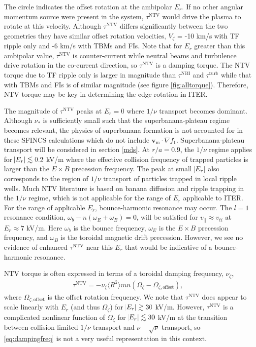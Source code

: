 \documentclass[aip, pop, preprint]{revtex4-1}
\numberwithin{figure}{section}
\numberwithin{equation}{section}
\begin{document}
The circle indicates the offset rotation at the ambipolar $E_r$. If no other angular momentum source were present in the system, $\tau^{\mathrm{NTV}}$ would drive the plasma to rotate at this velocity. Although $\tau^{\mathrm{NTV}}$ differs significantly between the two geometries they have similar offset rotation velocities, $V_{\zeta}$ = -10 km/s with TF ripple only and -6 km/s with TBMs and FIs. Note that for $E_r$ greater than this ambipolar value, $\tau^{\mathrm{NTV}}$ is counter-current while neutral beams and turbulence drive rotation in the co-current direction, so $\tau^{\mathrm{NTV}}$ is a damping torque. The NTV torque due to TF ripple only is larger in magnitude than $\tau^{\mathrm{NBI}}$ and $\tau^{\mathrm{turb}}$ while that with TBMs and FIs is of similar magnitude (see figure \ref{fig:alltorque}). Therefore, NTV torque may be key in determining the edge rotation in ITER. 

The magnitude of $\tau^{\mathrm{NTV}}$ peaks at $E_r = 0$ where $1/\nu$ transport becomes dominant. Although $\nu_*$ is sufficiently small such that the superbanana-plateau regime becomes relevant, the physics of superbanana formation is not accounted for in these SFINCS calculations which do not include $\bm{v}_{\mathrm{m}} \cdot \nabla f_1$. Superbanana-plateau transport will be considered in section \ref{mds}. At $r/a = 0.9$, the $1/\nu$ regime applies for $\abs{E_r} \lesssim 0.2$ kV/m where the effective collision frequency of trapped particles is larger than the $E \times B$ precession frequency. The peak at small $\abs{E_r}$ also corresponds to the region of $1/\nu$ transport of particles trapped in local ripple wells. Much NTV literature is based on banana diffusion and ripple trapping in the $1/\nu$ regime,\cite{Stringer1972, Connor1974} which is not applicable for the range of $E_r$ applicable to ITER. For the range of applicable $E_r$, bounce-harmonic resonance may occur. The $l =1$ resonance condition, $\omega_b - n(\omega_E + \omega_B) = 0$, will be satisfied for $v_{||} \approx v_{ti}$ at $E_r \approx 7$ kV/m. Here $\omega_b$ is the bounce frequency, $\omega_E$ is the $E \times B$ precession frequency, and $\omega_B$ is the toroidal magnetic drift precession.\cite{Park2009} However, we see no evidence of enhanced $\tau^{\mathrm{NTV}}$ near this $E_r$ that would be indicative of a bounce-harmonic resonance.

NTV torque is often expressed in terms of a toroidal damping frequency, $\nu_{\zeta}$,
\begin{gather}
\tau^{\mathrm{NTV}} = - \nu_{\zeta} \langle R^2 \rangle m n ( \Omega_{\zeta} - \Omega_{\zeta, \mathrm{offset}}),
\label{eq:dampingfreq}
\end{gather}
where $\Omega_{\zeta, \mathrm{offset}}$ is the offset rotation frequency. We note that $\tau^{\mathrm{NTV}}$ does appear to scale linearly with $E_r$ (and thus $\Omega_{\zeta}$) for $\abs{E_r} \gtrsim 30$ kV/m. However, $\tau^{\mathrm{NTV}}$ is a complicated nonlinear function of $\Omega_{\zeta}$ for $\abs{E_r} \lesssim 30$ kV/m at the transition between collision-limited $1/\nu$ transport and $\nu-\sqrt{\nu}$ transport, so \ref{eq:dampingfreq} is not a very useful representation in this context. 
\end{document}
